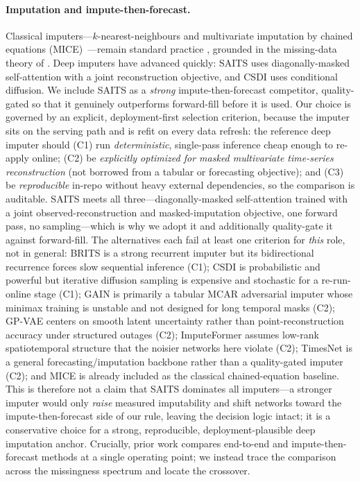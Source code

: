 \documentclass[review,3p,times]{elsarticle}
\begin{document}
\paragraph{Imputation and impute-then-forecast.}
Classical imputers---$k$-nearest-neighbours \citep{troyanskaya2001missing} and
multivariate imputation by chained equations
(MICE)~\citep{vanbuuren2011mice}---remain standard practice
\citep{moritz2017imputets}, grounded in the missing-data theory of
\citet{little2019statistical}. Deep imputers have advanced quickly: SAITS
\citep{du2023saits} uses diagonally-masked self-attention with a joint
reconstruction objective, and CSDI \citep{tashiro2021csdi} uses conditional
diffusion. We include SAITS as a \emph{strong} impute-then-forecast competitor,
quality-gated so that it genuinely outperforms forward-fill before it is used.
Our choice is governed by an explicit, deployment-first selection criterion,
because the imputer sits on the serving path and is refit on every data refresh:
the reference deep imputer should (C1) run \emph{deterministic}, single-pass
inference cheap enough to re-apply online; (C2) be \emph{explicitly optimized for
masked multivariate time-series reconstruction} (not borrowed from a tabular or
forecasting objective); and (C3) be \emph{reproducible} in-repo without heavy
external dependencies, so the comparison is auditable. SAITS
\citep{du2023saits} meets all three---diagonally-masked self-attention trained
with a joint observed-reconstruction and masked-imputation objective, one
forward pass, no sampling---which is why we adopt it and additionally
quality-gate it against forward-fill. The alternatives each fail at least one
criterion for \emph{this} role, not in general:
BRITS \citep{cao2018brits} is a strong recurrent imputer but its bidirectional
recurrence forces slow sequential inference (C1); CSDI \citep{tashiro2021csdi} is
probabilistic and powerful but iterative diffusion sampling is expensive and
stochastic for a re-run-online stage (C1); GAIN \citep{yoon2018gain} is primarily
a tabular MCAR adversarial imputer whose minimax training is unstable and not
designed for long temporal masks (C2); GP-VAE \citep{fortuin2020gpvae} centers on
smooth latent uncertainty rather than point-reconstruction accuracy under
structured outages (C2); ImputeFormer \citep{nie2024imputeformer} assumes
low-rank spatiotemporal structure that the noisier networks here violate (C2);
TimesNet \citep{wu2023timesnet} is a general forecasting/imputation backbone
rather than a quality-gated imputer (C2); and MICE is already included as the
classical chained-equation baseline. This is therefore not a claim that SAITS
dominates all imputers---a stronger imputer would only \emph{raise} measured
imputability and shift networks toward the impute-then-forecast side of our rule,
leaving the decision logic intact; it is a conservative choice for a strong,
reproducible, deployment-plausible deep imputation anchor.
Crucially, prior work compares end-to-end and impute-then-forecast methods at a
single operating point; we instead trace the comparison across the missingness
spectrum and locate the crossover.
\end{document}
